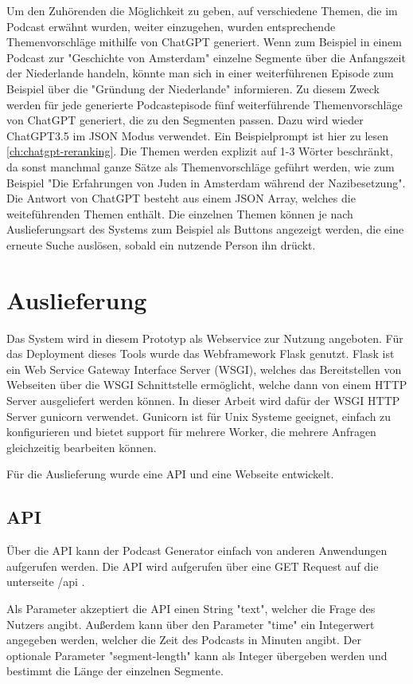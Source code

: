 Um den Zuhörenden die Möglichkeit zu geben, auf verschiedene Themen, die im Podcast erwähnt wurden, weiter einzugehen, wurden entsprechende Themenvorschläge mithilfe von ChatGPT generiert.
Wenn zum Beispiel in einem Podcast zur "Geschichte von Amsterdam" einzelne Segmente über die Anfangszeit der Niederlande handeln, könnte man sich in einer weiterführenen Episode zum Beispiel über die "Gründung der Niederlande" informieren.
Zu diesem Zweck werden für jede generierte Podcastepisode fünf weiterführende Themenvorschläge von ChatGPT generiert, die zu den Segmenten passen.
Dazu wird wieder ChatGPT3.5 im JSON Modus verwendet.
Ein Beispielprompt ist hier zu lesen \autoref{ch:chatgpt-reranking}.
Die Themen werden explizit auf 1-3 Wörter beschränkt, da sonst manchmal ganze Sätze als Themenvorschläge geführt werden, wie zum Beispiel "Die Erfahrungen von Juden in Amsterdam während der Nazibesetzung".
Die Antwort von ChatGPT besteht aus einem JSON Array, welches die weiteführenden Themen enthält.
Die einzelnen Themen können je nach Auslieferungsart des Systems zum Beispiel als Buttons angezeigt werden, die eine erneute Suche auslösen, sobald ein nutzende Person ihn drückt.

\section{Auslieferung}

Das System wird in diesem Prototyp als Webservice zur Nutzung angeboten. 
Für das Deployment dieses Tools wurde das Webframework Flask genutzt.
Flask ist ein Web Service Gateway Interface Server (WSGI), welches das Bereitstellen von Webseiten über die WSGI Schnittstelle ermöglicht, welche dann von einem HTTP Server ausgeliefert werden können.
In dieser Arbeit wird dafür der WSGI HTTP Server gunicorn verwendet.
Gunicorn ist für Unix Systeme geeignet, einfach zu konfigurieren und bietet support für mehrere Worker, die mehrere Anfragen gleichzeitig bearbeiten können.

Für die Auslieferung wurde eine API und eine Webseite entwickelt.

\subsection{API}

Über die API kann der Podcast Generator einfach von anderen Anwendungen aufgerufen werden.
Die API wird aufgerufen über eine GET Request auf die unterseite /api .

Als Parameter akzeptiert die API einen String "text", welcher die Frage des Nutzers angibt.
Außerdem kann über den Parameter "time" ein Integerwert angegeben werden, welcher die Zeit des Podcasts in Minuten angibt.
Der optionale Parameter "segment-length" kann als Integer übergeben werden und bestimmt die Länge der einzelnen Segmente.

